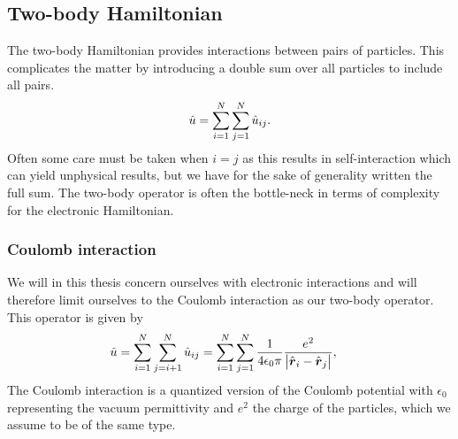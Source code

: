         \subsection{Two-body Hamiltonian}
            The two-body Hamiltonian provides interactions between pairs of
            particles.
            This complicates the matter by introducing a double sum over all
            particles to include all pairs.
            \begin{align}
                \hat{u}
                = \sum_{i = 1}^{N} \sum_{j = 1}^{N} \hat{u}_{ij}.
            \end{align}
            Often some care must be taken when $i = j$ as this results in
            self-interaction which can yield unphysical results, but we have
            for the sake of generality written the full sum.
            The two-body operator is often the bottle-neck in terms of
            complexity for the electronic Hamiltonian.

            \subsubsection{Coulomb interaction}
                We will in this thesis concern ourselves with electronic
                interactions and will therefore limit ourselves to the Coulomb
                interaction as our two-body operator.
                This operator is given by
                \begin{align}
                    \hat{u}
                    &= \sum_{i = 1}^{N}\sum_{j = i + 1}^{N}
                    \hat{u}_{ij}
                    = \sum_{i = 1}^{N}\sum_{j = 1}^{N}
                    \frac{1}{4\epsilon_0\pi}\frac{e^2}{\abs{\hat{\boldsymbol{r}}_i -
                    \hat{\boldsymbol{r}}_j}},
                \end{align}
                The Coulomb interaction is a quantized version of the Coulomb
                potential with $\epsilon_0$ representing the vacuum
                permittivity and $e^2$ the charge of the particles, which we
                assume to be of the same type.

